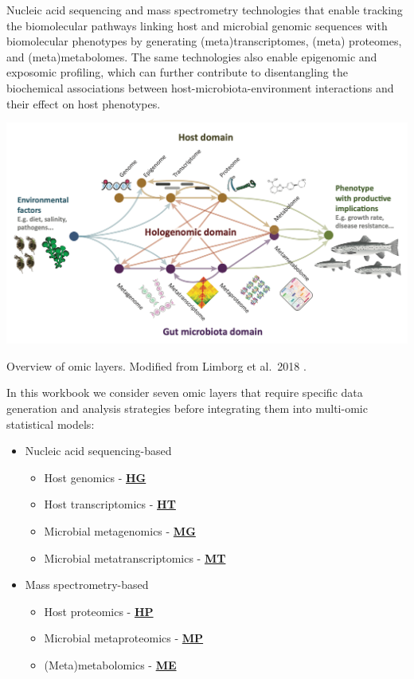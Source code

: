 \documentclass[
]{book}
\providecommand{\tightlist}{%
  \setlength{\itemsep}{0pt}\setlength{\parskip}{0pt}}
\begin{document}
Nucleic acid sequencing and mass spectrometry technologies that enable tracking the biomolecular pathways linking host and microbial genomic sequences with biomolecular phenotypes by generating (meta)transcriptomes, (meta) proteomes, and (meta)metabolomes. The same technologies also enable epigenomic and exposomic profiling, which can further contribute to disentangling the biochemical associations between host-microbiota-environment interactions and their effect on host phenotypes.

\includegraphics{images/omic_layers_limborg.png}

Overview of omic layers. Modified from Limborg et al.~2018 \citep{Limborg2018-tf}.

In this workbook we consider seven omic layers that require specific data generation and analysis strategies before integrating them into multi-omic statistical models:

\begin{itemize}
\tightlist
\item
  Nucleic acid sequencing-based

  \begin{itemize}
  \tightlist
  \item
    Host genomics - \textbf{\protect\hyperlink{host-genomics}{HG}}
  \item
    Host transcriptomics - \textbf{\protect\hyperlink{host-transcriptomics}{HT}}
  \item
    Microbial metagenomics - \textbf{\protect\hyperlink{microbial-metagenomics}{MG}}
  \item
    Microbial metatranscriptomics - \textbf{\protect\hyperlink{microbial-metatranscriptomics}{MT}}
  \end{itemize}
\item
  Mass spectrometry-based

  \begin{itemize}
  \tightlist
  \item
    Host proteomics - \textbf{\protect\hyperlink{host-proteomics}{HP}}
  \item
    Microbial metaproteomics - \textbf{\protect\hyperlink{microbial-metaproteomics}{MP}}
  \item
    (Meta)metabolomics - \textbf{\protect\hyperlink{meta-metabolomics}{ME}}
  \end{itemize}
\end{itemize}
\end{document}
